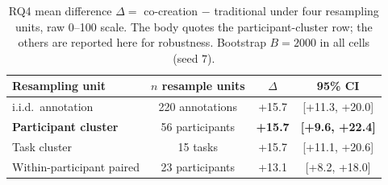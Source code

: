 \begin{table}[t]
\centering\footnotesize
\caption{RQ4 mean difference $\Delta = $ co-creation $-$ traditional under four resampling units, raw 0--100 scale. The body quotes the participant-cluster row; the others are reported here for robustness. Bootstrap $B=2000$ in all cells (seed $7$).}
\label{tbl-rq4-bootstraps}
\setlength{\tabcolsep}{4pt}
\begin{tabular*}{\textwidth}{@{\extracolsep{\fill}}lccc@{}}
\toprule
Resampling unit & $n$ resample units & $\Delta$ & 95\% CI \\
\midrule
i.i.d.\ annotation & 220 annotations & +15.7 & [+11.3, +20.0] \\
\textbf{Participant cluster} & 56 participants & \textbf{+15.7} & \textbf{[+9.6, +22.4]} \\
Task cluster & 15 tasks & +15.7 & [+11.1, +20.6] \\
Within-participant paired & 23 participants & +13.1 & [+8.2, +18.0] \\
\bottomrule
\end{tabular*}
\end{table}
